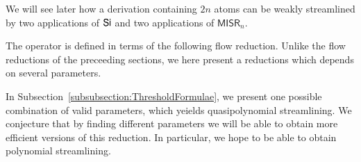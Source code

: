\newcommand{\MISR}{\mathsf{MISR}}


We will see later how a derivation containing $2n$ atoms can be weakly streamlined by two applications of $\mathsf{Si}$ and two applications of $\MISR_n$.

The operator is defined in terms of the following flow reduction. Unlike the flow reductions of the preceeding sections, we here present a reductions which depends on several parameters.

In Subsection~\vref{subsubsection:ThresholdFormulae}, we present one possible combination of valid parameters, which yeields quasipolynomial streamlining. We conjecture that by finding different parameters we will be able to obtain more efficient versions of this reduction. In particular, we hope to be able to obtain polynomial streamlining.


